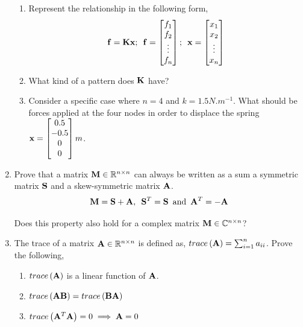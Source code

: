 \begin{enumerate}[resume]
\begin{center}
    \end{center}
    \begin{enumerate}
        \item Represent the relationship in the following form,
        \[ \mathbf{f} = \mathbf{Kx}; \,\,\, \mathbf{f} = \begin{bmatrix}f_1\\ f_2\\ \vdots\\ f_n\end{bmatrix}; \,\,\, \mathbf{x} = \begin{bmatrix}x_1 \\ x_2 \\ \vdots \\ x_n\end{bmatrix}\]
        \item What kind of a pattern does $\mathbf{K}$ have?
        \item Consider a specific case where $n = 4$ and $k = 1.5 N.m^{-1}$. What should be forces applied at the four nodes in order to displace the spring $\mf{x} = \begin{bmatrix*} 0.5 \\ -0.5 \\ 0 \\ 0 \end{bmatrix*}m$. 
    \end{enumerate}

    \item Prove that a matrix $\mathbf{M} \in \mathbb{R}^{n \times n}$ can always be written as a sum a symmetric matrix $\mathbf{S}$ and a skew-symmetric matrix $\mathbf{A}$.
    \[ \mathbf{M} = \mathbf{S} + \mathbf{A}, \,\,\, \mathbf{S}^T = \mathbf{S} \, \text{ and } \, \mathbf{A}^T = -\mathbf{A} \]

    Does this property also hold for a complex matrix $\mathbf{M} \in \mathbb{C}^{n \times n}$?
    \item The trace of a matrix $\mathbf{A} \in \mathbb{R}^{n \times n}$ is defined as, $trace\left(\mathbf{A}\right) = \sum_{i=1}^{n}a_{ii}$. Prove the following,
    \begin{enumerate}
        \item $trace\left(\mathbf{A}\right)$ is a linear function of $\mathbf{A}$.
        \item $trace\left(\mathbf{AB}\right) = trace\left(\mathbf{BA}\right)$
        \item $trace\left(\mathbf{A}^T\mathbf{A}\right) = 0 \implies \mathbf{A} = 0$
    \end{enumerate}


\end{enumerate}
